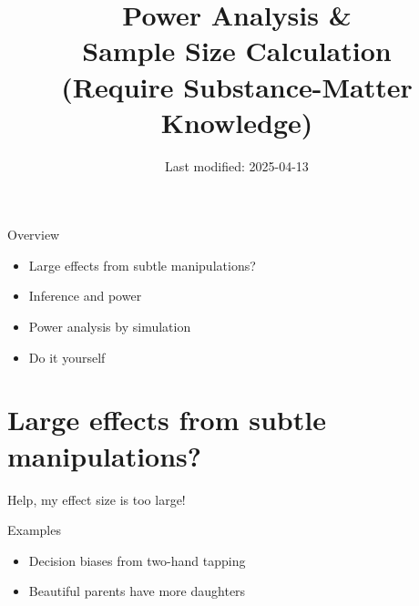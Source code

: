\documentclass[aspectratio=169]{beamer}
\begin{document}
\title{Power Analysis \&\\
       Sample Size Calculation\\[2ex]

\small (Require Substance-Matter Knowledge)}

\author{}
\date{Last modified: 2025-04-13}

\begin{frame}
\thispagestyle{empty}
\titlepage
\end{frame}


%


\begin{frame}{Overview}

\begin{itemize}
\item Large effects from subtle manipulations?
\item Inference and power
\item Power analysis by simulation
\item Do it yourself
\end{itemize}

\end{frame}



\section{Large effects from subtle manipulations?}


\begin{frame}{Help, my effect size is too large!}

Examples
\begin{itemize}
\item Decision biases from two-hand tapping
\item Beautiful parents have more daughters
\end{itemize}

\end{frame}
\end{document}
